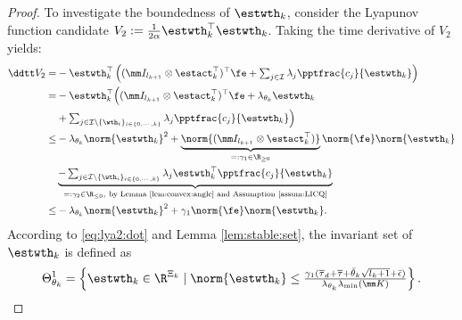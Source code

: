 \documentclass[journal]{IEEEtran}
\begin{document}
\begin{proof}
To investigate the boundedness of $\estwth_k$, consider the Lyapunov function candidate $V_2:=\tfrac{1}{2\alpha}\estwth_k^\top \estwth_k$.
Taking the time derivative of $V_2$ yields:
\begin{equation}
    \begin{aligned}
        \ddtt V_2 
        =& 
        -\estwth_k^\top 
        \left(
            (\mm I_{l_{k+1}}\otimes \estact_k^\top)^\top
            \fe
            +
            \textstyle\sum_{j\in\mathcal{I}}
            \lambda_j 
            \pptfrac{c_j}{\estwth_k}
        \right)
        \\
        =&
        -\estwth_k^\top 
        \Big(
            (\mm I_{l_{k+1}}\otimes \estact_k^\top)^\top
            \fe
            +
            \lambda_{\theta_k}\estwth_k
        \\
        &
            +
            \textstyle\sum_{
                j\in\mathcal{I}\setminus \{\wth_i\}_{i\in\{0,\cdots,k\}}
            }
            \lambda_j 
            \pptfrac{c_j}{\estwth_k}
        \Big)
        \\
        \le&
        -
        \lambda_{\theta_k}\norm{\estwth_k}^2
        +
        \underbrace{
            \norm{(\mm I_{l_{k+1}}\otimes {\estact}_k^\top)}
        }_{=:{\gamma}_1\in\R_{\ge0}}
        \norm{\fe}
        \norm{\estwth_k}
        \\
        &
        \underbrace{
            -
            \textstyle\sum_{
                j\in\mathcal{I}\setminus \{\wth_i\}_{i\in\{0,\cdots,k\}}
            }
            \lambda_j 
            \estwth_k^\top \pptfrac{c_j}{\estwth_k}
        }_{=:{\gamma}_2\in\R_{\le0},\ \text{by Lemma \ref{lem:convex:angle} and Assumption \ref{assum:LICQ}}}
        \\
        \le&
        -
        \lambda_{\theta_k}\norm{\estwth_k}^2
        +
        {\gamma}_1     
        \norm{\fe}
        \norm{\estwth_k}
        .
    \end{aligned}
    \label{eq:lya2:dot}
\end{equation}
According to \eqref{eq:lya2:dot} and Lemma \ref{lem:stable:set}, the invariant set of $\estwth_k$ is defined as
\begin{equation}
    \Theta_{\theta_k}^{1} 
    = 
    \left\{ 
        \estwth_k \in \R^{\Xi_{k}} 
        \mid 
        \norm{\estwth_k} 
        \le 
        \tfrac{
            {\gamma}_1
            (
                \overline\tau_d
                +
                \overline\tau
                +
                \bar{\theta}_k\sqrt{l_{k}+1}
                +
                \bar{\epsilon}
            )
        }{
            \lambda_{\theta_k}\lambda_{\min}(\mm K)
        }
    \right\}
    .
    \label{eq:invariant:c1:wth}
\end{equation}


\end{proof}
\end{document}
